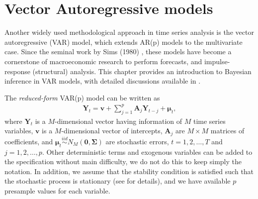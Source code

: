 \section{Vector Autoregressive models}\label{sec84}
Another widely used methodological approach in time series analysis is the vector autoregressive (VAR) model, which extends AR(p) models to the multivariate case. Since the seminal work by Sims (1980) \cite{sims1980macroeconomics}, these models have become a cornerstone of macroeconomic research to perform forecasts, and impulse-response (structural) analysis. This chapter provides an introduction to Bayesian inference in VAR models, with detailed discussions available in \cite{koop2010bayesian,DelNegro2011VAR,wozniak2016bayesian,chan2019bayesian}.

The \textit{reduced-form} VAR(p) model can be written as
\begin{align}\label{eqVAR}
	\bm{Y}_t=\bm{v} + \sum_{j=1}^p\bm{A}_{j}\bm{Y}_{t-j}+\bm{\mu}_t,
\end{align}
where $\bm{Y}_t$ is a $M$-dimensional vector having information of $M$ time series variables, $\bm{v}$ is a $M$-dimensional vector of intercepts, $\bm{A}_{j}$ are $M\times M$ matrices of coefficients, and $\bm{\mu}_t \stackrel{iid}{\sim} N_M(\bm{0}, \bm{\Sigma})$ are stochastic errors, $t=1,2,\dots,T$ and $j=1,2,\dots,p$. Other deterministic terms and exogenous variables can be added to the specification without main difficulty, we do not do this to keep simply the notation. In addition, we assume that the stability condition is satisfied such that the stochastic process is stationary (see \cite[Chap.~2]{helmut2005new} for details), and we have available $p$ presample values for each variable. 

